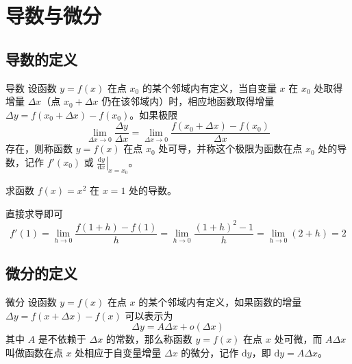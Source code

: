 \chapter{导数与微分}

\section{导数的定义}

\begin{definition}{导数}
设函数 \( y = f(x) \) 在点 \( x_0 \) 的某个邻域内有定义，当自变量 \( x \) 在 \( x_0 \) 处取得增量 \( \Delta x \)（点 \( x_0 + \Delta x \) 仍在该邻域内）时，相应地函数取得增量 \( \Delta y = f(x_0 + \Delta x) - f(x_0) \)。如果极限
\[ \lim_{\Delta x \to 0} \frac{\Delta y}{\Delta x} = \lim_{\Delta x \to 0} \frac{f(x_0 + \Delta x) - f(x_0)}{\Delta x} \]
存在，则称函数 \( y = f(x) \) 在点 \( x_0 \) 处可导，并称这个极限为函数在点 \( x_0 \) 处的导数，记作 \( f'(x_0) \) 或 \( \left. \frac{\mathrm{d} y}{\mathrm{d} x} \right|_{x = x_0} \)。
\end{definition}

\begin{example}
求函数 \( f(x) = x^2 \) 在 \( x = 1 \) 处的导数。
\end{example}

\begin{solution}
直接求导即可
    \[
f'(1) = \lim_{h \to 0} \frac{f(1+h) - f(1)}{h} = \lim_{h \to 0} \frac{(1+h)^2 - 1}{h} = \lim_{h \to 0} (2 + h) = 2
\]
\end{solution}

\section{微分的定义}

\begin{definition}{微分}
设函数 \( y = f(x) \) 在点 \( x \) 的某个邻域内有定义，如果函数的增量 \( \Delta y = f(x + \Delta x) - f(x) \) 可以表示为
\[ \Delta y = A \Delta x + o(\Delta x) \]
其中 \( A \) 是不依赖于 \( \Delta x \) 的常数，那么称函数 \( y = f(x) \) 在点 \( x \) 处可微，而 \( A \Delta x \) 叫做函数在点 \( x \) 处相应于自变量增量 \( \Delta x \) 的微分，记作 \( \mathrm{d}y \)，即 \( \mathrm{d}y = A \Delta x \)。
\end{definition}

